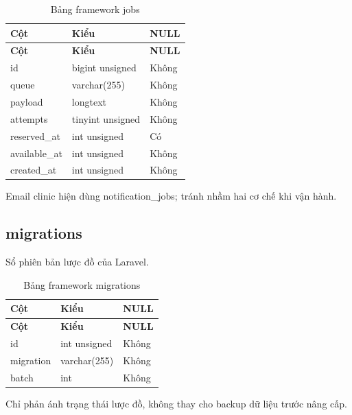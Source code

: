 {\fontsize{10}{12}\selectfont\setlength{\tabcolsep}{3pt}\renewcommand{\arraystretch}{1.12}
\begin{longtable}{@{}L{\textwidth-5.28pt\relax} L{\textwidth-4.8pt\relax} L{\textwidth-1.92pt\relax}@{}}
\caption{Bảng framework jobs}\\
\toprule
\textbf{Cột} & \textbf{Kiểu} & \textbf{NULL}\\\midrule
\endfirsthead
\toprule
\textbf{Cột} & \textbf{Kiểu} & \textbf{NULL}\\\midrule
\endhead
\bottomrule\endlastfoot
id & bigint unsigned & Không\\[1pt]
queue & varchar(255) & Không\\[1pt]
payload & longtext & Không\\[1pt]
attempts & tinyint unsigned & Không\\[1pt]
reserved\_\allowbreak{}at & int unsigned & Có\\[1pt]
available\_\allowbreak{}at & int unsigned & Không\\[1pt]
created\_\allowbreak{}at & int unsigned & Không\\[1pt]
\end{longtable}}
{\small Email clinic hiện dùng notification\_\allowbreak{}jobs; tránh nhầm hai cơ chế khi vận hành.\allowbreak{}

}

\subsection{migrations}
Sổ phiên bản lược đồ của Laravel.\allowbreak{}


{\fontsize{10}{12}\selectfont\setlength{\tabcolsep}{3pt}\renewcommand{\arraystretch}{1.12}
\begin{longtable}{@{}L{\textwidth-5.28pt\relax} L{\textwidth-4.8pt\relax} L{\textwidth-1.92pt\relax}@{}}
\caption{Bảng framework migrations}\\
\toprule
\textbf{Cột} & \textbf{Kiểu} & \textbf{NULL}\\\midrule
\endfirsthead
\toprule
\textbf{Cột} & \textbf{Kiểu} & \textbf{NULL}\\\midrule
\endhead
\bottomrule\endlastfoot
id & int unsigned & Không\\[1pt]
migration & varchar(255) & Không\\[1pt]
batch & int & Không\\[1pt]
\end{longtable}}
{\small Chỉ phản ánh trạng thái lược đồ, không thay cho backup dữ liệu trước nâng cấp.\allowbreak{}

}
\clearpage

